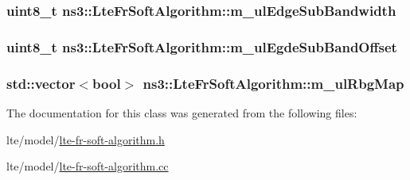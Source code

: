 \subsubsection[{\texorpdfstring{m\+\_\+ul\+Edge\+Sub\+Bandwidth}{m_ulEdgeSubBandwidth}}]{\setlength{\rightskip}{0pt plus 5cm}uint8\+\_\+t ns3\+::\+Lte\+Fr\+Soft\+Algorithm\+::m\+\_\+ul\+Edge\+Sub\+Bandwidth\hspace{0.3cm}{\ttfamily [private]}}\hypertarget{classns3_1_1LteFrSoftAlgorithm_a32a47126b3423faab9941788f5ea78a3}{}\label{classns3_1_1LteFrSoftAlgorithm_a32a47126b3423faab9941788f5ea78a3}
\subsubsection[{\texorpdfstring{m\+\_\+ul\+Egde\+Sub\+Band\+Offset}{m_ulEgdeSubBandOffset}}]{\setlength{\rightskip}{0pt plus 5cm}uint8\+\_\+t ns3\+::\+Lte\+Fr\+Soft\+Algorithm\+::m\+\_\+ul\+Egde\+Sub\+Band\+Offset\hspace{0.3cm}{\ttfamily [private]}}\hypertarget{classns3_1_1LteFrSoftAlgorithm_a10b3660c54a8f9f05f05708509283f11}{}\label{classns3_1_1LteFrSoftAlgorithm_a10b3660c54a8f9f05f05708509283f11}
\subsubsection[{\texorpdfstring{m\+\_\+ul\+Rbg\+Map}{m_ulRbgMap}}]{\setlength{\rightskip}{0pt plus 5cm}std\+::vector$<$bool$>$ ns3\+::\+Lte\+Fr\+Soft\+Algorithm\+::m\+\_\+ul\+Rbg\+Map\hspace{0.3cm}{\ttfamily [private]}}\hypertarget{classns3_1_1LteFrSoftAlgorithm_a9fad0a48f5d20e7da764a09784df488d}{}\label{classns3_1_1LteFrSoftAlgorithm_a9fad0a48f5d20e7da764a09784df488d}


The documentation for this class was generated from the following files\+:\begin{DoxyCompactItemize}
\item 
lte/model/\hyperlink{lte-fr-soft-algorithm_8h}{lte-\/fr-\/soft-\/algorithm.\+h}\item 
lte/model/\hyperlink{lte-fr-soft-algorithm_8cc}{lte-\/fr-\/soft-\/algorithm.\+cc}\end{DoxyCompactItemize}
